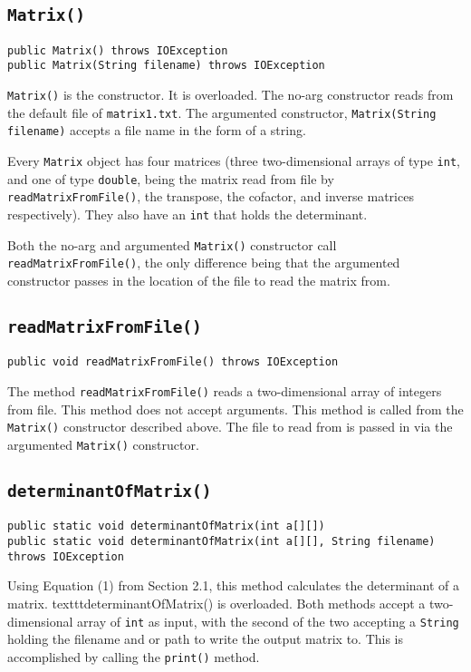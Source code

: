 \documentclass[12pt]{article}
\begin{document}
\subsection{\texttt{Matrix()}}
\begin{verbatim}
public Matrix() throws IOException
public Matrix(String filename) throws IOException
\end{verbatim}
\texttt{Matrix()} is the constructor. It is overloaded. The no-arg constructor reads from the default file of \texttt{matrix1.txt}. The argumented constructor, \texttt{Matrix(String filename)} accepts a file name in the form of a string.
\par Every \texttt{Matrix} object has four matrices (three two-dimensional arrays of type \texttt{int}, and one of type \texttt{double}, being the matrix read from file by \texttt{readMatrixFromFile()}, the transpose, the cofactor, and inverse matrices respectively). They also have an \texttt{int} that holds the determinant.
\par Both the no-arg and argumented \texttt{Matrix()} constructor call \texttt{readMatrixFromFile()}, the only difference being that the argumented constructor passes in the location of the file to read the matrix from.

\subsection{\texttt{readMatrixFromFile()}}
\begin{verbatim}
public void readMatrixFromFile() throws IOException
\end{verbatim}
The method \texttt{readMatrixFromFile()} reads a two-dimensional array of integers from file. This method does not accept arguments. This method is called from the \texttt{Matrix()} constructor described above. The file to read from is passed in via the argumented \texttt{Matrix()} constructor.

\subsection{\texttt{determinantOfMatrix()}}
\begin{verbatim}
public static void determinantOfMatrix(int a[][])
public static void determinantOfMatrix(int a[][], String filename) throws IOException
\end{verbatim}
Using Equation (1) from Section 2.1, this method calculates the determinant of a matrix. texttt{determinantOfMatrix()} is overloaded. Both methods accept a two-dimensional array of \texttt{int} as input, with the second of the two accepting a \texttt{String} holding the filename and or path to write the output matrix to. This is accomplished by calling the \texttt{print()} method.
\end{document}
